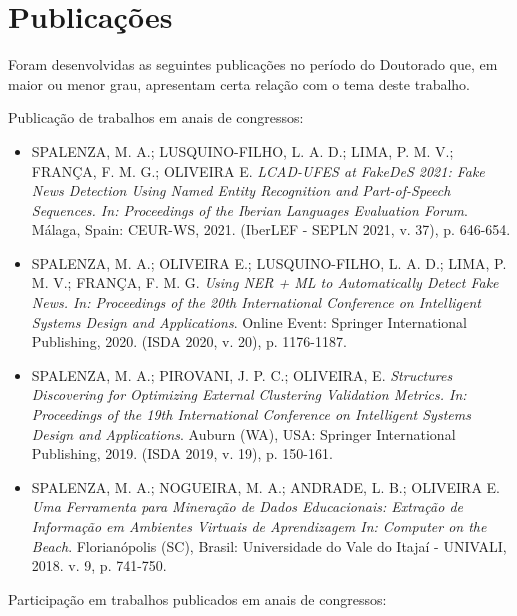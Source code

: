 \documentclass[
	12pt,				%
	openright,			%
	twoside,			%
	a4paper,			%
	english,			%
	french,				%
	spanish,			%
	brazil				%
	]{abntex2}
\begin{document}
\chapter*{Publicações}
Foram desenvolvidas as seguintes publicações no período do Doutorado que, em maior ou menor grau, apresentam certa relação com o tema deste trabalho.

\noindent Publicação de trabalhos em anais de congressos:

\begin{itemize}[label={}]
\scriptsize
\item SPALENZA, M. A.; LUSQUINO-FILHO, L. A. D.; LIMA, P. M. V.; FRANÇA, F. M. G.; OLIVEIRA E. \textit{LCAD-UFES at FakeDeS 2021: Fake News Detection Using Named Entity Recognition and Part-of-Speech Sequences. In: Proceedings of the Iberian Languages Evaluation Forum}. M{\'a}laga, Spain: CEUR-WS, 2021. (IberLEF - SEPLN 2021, v. 37), p. 646-654.

\item SPALENZA, M. A.; OLIVEIRA E.; LUSQUINO-FILHO, L. A. D.; LIMA, P. M. V.; FRANÇA, F. M. G. \textit{Using NER + ML to Automatically Detect Fake News. In: Proceedings of the 20th International Conference on Intelligent Systems Design and Applications}. Online Event: Springer International Publishing, 2020. (ISDA 2020, v. 20), p. 1176-1187.

\item SPALENZA, M. A.; PIROVANI, J. P. C.; OLIVEIRA, E. \textit{Structures Discovering for Optimizing External Clustering Validation Metrics. In: Proceedings of the 19th International Conference on Intelligent Systems Design and Applications}. Auburn (WA), USA: Springer International Publishing, 2019. (ISDA 2019, v. 19), p. 150-161.

\item SPALENZA, M. A.; NOGUEIRA, M. A.; ANDRADE, L. B.; OLIVEIRA E. \textit{Uma Ferramenta para Minera{\c c}{\~a}o de Dados Educacionais: Extra{\c c}{\~a}o de Informa{\c c}{\~a}o em Ambientes Virtuais de Aprendizagem In: Computer on the Beach}. Florian{\'o}polis (SC), Brasil: Universidade do Vale do Itajaí - UNIVALI, 2018. v. 9, p. 741-750.

\end{itemize}

\noindent Participação em trabalhos publicados em anais de congressos:
\end{document}
